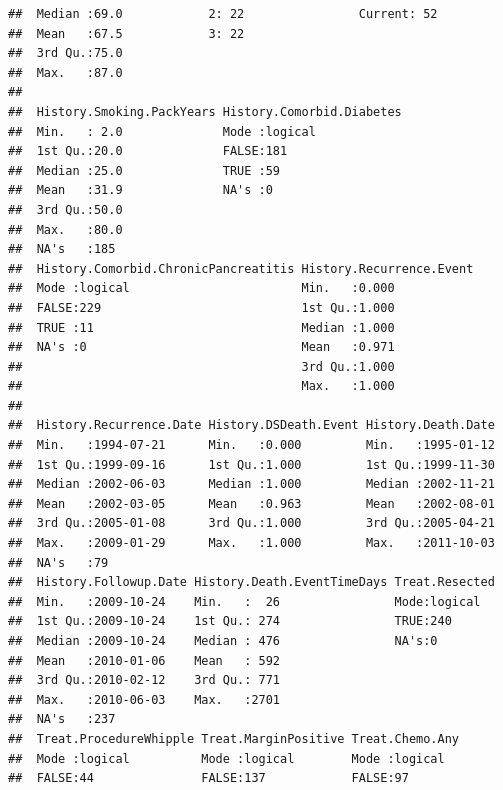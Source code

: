 \documentclass{article}\usepackage[]{graphicx}\usepackage[]{color}
\makeatletter
\newenvironment{kframe}{%
 \def\at@end@of@kframe{}%
 \ifinner\ifhmode%
  \def\at@end@of@kframe{\end{minipage}}%
  \begin{minipage}{\columnwidth}%
 \fi\fi%
 \def\FrameCommand##1{\hskip\@totalleftmargin \hskip-\fboxsep
 \colorbox{shadecolor}{##1}\hskip-\fboxsep
     \hskip-\linewidth \hskip-\@totalleftmargin \hskip\columnwidth}%
 \MakeFramed {\advance\hsize-\width
   \@totalleftmargin\z@ \linewidth\hsize
   \@setminipage}}%
 {\par\unskip\endMakeFramed%
 \at@end@of@kframe}
\newenvironment{knitrout}{}{} %
\makeatother
\begin{document}
\begin{knitrout}
\begin{kframe}
\begin{verbatim}
##  Median :69.0            2: 22                Current: 52           
##  Mean   :67.5            3: 22                                      
##  3rd Qu.:75.0                                                       
##  Max.   :87.0                                                       
##                                                                     
##  History.Smoking.PackYears History.Comorbid.Diabetes
##  Min.   : 2.0              Mode :logical            
##  1st Qu.:20.0              FALSE:181                
##  Median :25.0              TRUE :59                 
##  Mean   :31.9              NA's :0                  
##  3rd Qu.:50.0                                       
##  Max.   :80.0                                       
##  NA's   :185                                        
##  History.Comorbid.ChronicPancreatitis History.Recurrence.Event
##  Mode :logical                        Min.   :0.000           
##  FALSE:229                            1st Qu.:1.000           
##  TRUE :11                             Median :1.000           
##  NA's :0                              Mean   :0.971           
##                                       3rd Qu.:1.000           
##                                       Max.   :1.000           
##                                                               
##  History.Recurrence.Date History.DSDeath.Event History.Death.Date  
##  Min.   :1994-07-21      Min.   :0.000         Min.   :1995-01-12  
##  1st Qu.:1999-09-16      1st Qu.:1.000         1st Qu.:1999-11-30  
##  Median :2002-06-03      Median :1.000         Median :2002-11-21  
##  Mean   :2002-03-05      Mean   :0.963         Mean   :2002-08-01  
##  3rd Qu.:2005-01-08      3rd Qu.:1.000         3rd Qu.:2005-04-21  
##  Max.   :2009-01-29      Max.   :1.000         Max.   :2011-10-03  
##  NA's   :79                                                        
##  History.Followup.Date History.Death.EventTimeDays Treat.Resected
##  Min.   :2009-10-24    Min.   :  26                Mode:logical  
##  1st Qu.:2009-10-24    1st Qu.: 274                TRUE:240      
##  Median :2009-10-24    Median : 476                NA's:0        
##  Mean   :2010-01-06    Mean   : 592                              
##  3rd Qu.:2010-02-12    3rd Qu.: 771                              
##  Max.   :2010-06-03    Max.   :2701                              
##  NA's   :237                                                     
##  Treat.ProcedureWhipple Treat.MarginPositive Treat.Chemo.Any
##  Mode :logical          Mode :logical        Mode :logical  
##  FALSE:44               FALSE:137            FALSE:97       

\end{verbatim}
\end{kframe}
\end{knitrout}
\end{document}
